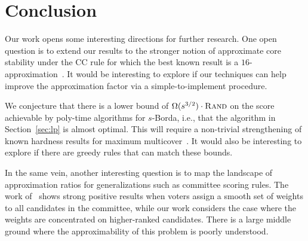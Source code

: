 \section{Conclusion}
Our work opens some interesting directions for further research. One open question is to extend our results to the stronger notion of approximate core stability under the CC rule for which the best known result is a $16$-approximation~\cite{ChengJMW20,JiangMW20}. It would be interesting to explore if our techniques can help improve the approximation factor via a simple-to-implement procedure. 

We conjecture that there is a lower bound of $\Omega(s^{3/2}) \cdot {\normalfont\textsc{Rand}}$ on the score achievable by poly-time algorithms for $s$-Borda, i.e., that the algorithm in Section~\ref{sec:lp} is almost optimal. This will require a non-trivial strengthening of known hardness results for maximum multicover~\cite{Barman}.  It would also be interesting to explore if there are greedy rules that can match these bounds.

In the same vein, another interesting question is to map the landscape of approximation ratios  for generalizations such as  committee scoring rules. The work of~\cite{Byrka} shows strong positive results when voters assign a smooth set of weights to all candidates in the committee, while our work considers the case where the weights are concentrated on higher-ranked candidates. There is a large middle ground where the approximability of this problem is poorly understood. 

